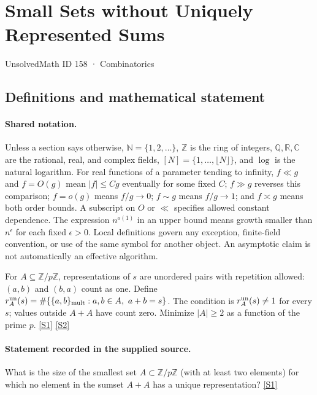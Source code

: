 \documentclass[11pt,a4paper]{article}
\newcommand{\N}{\mathbb{N}}
\newcommand{\Z}{\mathbb{Z}}
\newcommand{\Q}{\mathbb{Q}}
\newcommand{\R}{\mathbb{R}}
\newcommand{\C}{\mathbb{C}}
\newcommand{\sref}[2]{\hyperlink{source:#1:#2}{[S#2]}}
\begin{document}

\setcounter{section}{157}

\section{Small Sets without Uniquely Represented Sums}\label{158}

{\small\sffamily UnsolvedMath ID 158 · Combinatorics}

\subsection{Definitions and mathematical statement}

\paragraph{Shared notation.}Unless a section says otherwise, $\N=\{1,2,\ldots\}$,
$\Z$ is the ring of integers, $\Q,\R,\C$ are the rational, real, and complex
fields, $[N]=\{1,\ldots,\lfloor N\rfloor\}$, and $\log$ is the natural
logarithm. For real functions of a parameter tending to infinity,
$f\ll g$ and $f=O(g)$ mean $|f|\leq Cg$ eventually for some fixed $C$;
$f\gg g$ reverses this comparison; $f=o(g)$ means $f/g\to0$;
$f\sim g$ means $f/g\to1$; and $f\asymp g$ means both order bounds.
A subscript on $O$ or $\ll$ specifies allowed constant dependence.
The expression $n^{o(1)}$ in an upper bound means growth smaller than
$n^\epsilon$ for each fixed $\epsilon>0$. Local definitions govern any
exception, finite-field convention, or use of the same symbol for another
object. An asymptotic claim is not automatically an effective algorithm.



For $A\subseteq\Z/p\Z$, representations of $s$ are unordered pairs with repetition allowed: $(a,b)$ and $(b,a)$ count as one. Define $r_A^{\rm un}(s)=\#\{\{a,b\}_{\rm mult}:a,b\in A,\ a+b=s\}$. The condition is $r_A^{\rm un}(s)\ne1$ for every $s$; values outside $A+A$ have count zero. Minimize $|A|\geq2$ as a function of the prime $p$. \sref{158}{1} \sref{158}{2}

\paragraph{Statement recorded in the supplied source.}
What is the size of the smallest set $A \subset \mathbb{Z}/p\mathbb{Z}$ (with at least two elements) for which no element in the sumset $A + A$ has a unique representation? \sref{158}{1}
\end{document}
